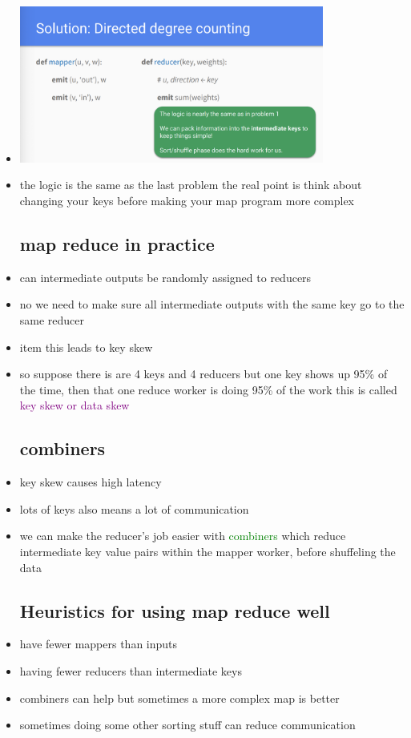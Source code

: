 \documentclass{article}
\begin{document}
\begin{itemize}
\item \includegraphics[width=10cm]{images/Screenshot 2023-05-08 at 5.10.06 PM.png}
\item the logic is the same as the last problem the real point is think about changing your keys before making your map program more complex
\subsection*{map reduce in practice}
\item can intermediate outputs be randomly assigned to reducers
\item no we need to make sure all intermediate outputs with the same key go to the same reducer
\item item this leads to key skew
\item so suppose there is are 4 keys and 4 reducers but one key shows up 95\% of the time, then that one reduce worker is doing 95\% of the work this is called \textcolor{purple}{key skew or data skew}
\subsection*{combiners}
\item key skew causes high latency
\item lots of keys also means a lot of communication 
\item we can make the reducer's job easier with \textcolor{green}{combiners} which reduce intermediate key value pairs within the mapper worker, before shuffeling the data
\subsection*{Heuristics for using map reduce well}
\item have fewer mappers than inputs 
\item having fewer reducers than intermediate keys
\item combiners can help but sometimes a more complex map is better 
\item sometimes doing some other sorting stuff can reduce communication 

\end{itemize}
\end{document}
